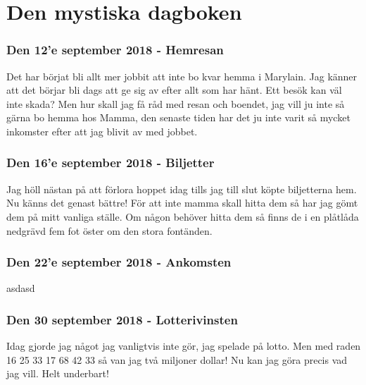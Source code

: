 
\part{Den mystiska dagboken}
\section{Den 12'e september 2018 - Hemresan}
Det har börjat bli allt mer jobbit att inte bo kvar hemma i Marylain. Jag känner att det börjar bli dags att ge sig av efter allt som har hänt. Ett besök kan väl inte skada? Men hur skall jag få råd med resan och boendet, jag vill ju inte så gärna bo hemma hos Mamma, den senaste tiden har det ju inte varit så mycket inkomster efter att jag blivit av med jobbet.
\section{Den 16'e september 2018 - Biljetter}
Jag höll nästan på att förlora hoppet idag tills jag till slut köpte biljetterna hem. Nu känns det genast bättre! För att inte mamma skall hitta dem så har jag gömt dem på mitt vanliga ställe. Om någon behöver hitta dem så finns de i en plåtlåda nedgrävd fem fot öster om den stora fontänden.
\section{Den 22'e september 2018 - Ankomsten}
asdasd

\section{Den 30 september 2018 - Lotterivinsten}
Idag gjorde jag något jag vanligtvis inte gör, jag spelade på lotto. Men med raden 16 25 33 17 68 42 33 så van jag två miljoner dollar! Nu kan jag göra precis vad jag vill. Helt underbart!
